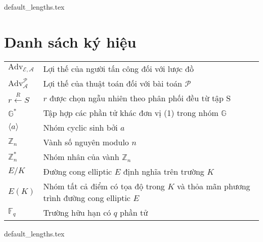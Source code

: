 \documentclass[class=report, crop=false]{standalone}
\begin{document}
	{default_lengths.tex}
	\baselineskip
	\chapter*{Danh sách ký hiệu}
	\begin{tabu}{>{\large}p{2cm} >{\large}X[l]}
		$\text{Adv}_\mathcal{E, A}$ 			& 	Lợi thế của người tấn công \adversary đối với lược đồ \scheme 							\\
		$\text{Adv}_\mathcal{A}^\mathcal{P}$ 	& 	Lợi thế của thuật toán \algo đối với bài toán $\mathcal{P}$ 							\\
		$r \xleftarrow{R} S$ 					& 	$r$ được chọn ngẫu nhiên theo phân phối đều từ tập S 									\\
		$\mathbb{G}^*$							& 	Tập hợp các phần tử khác đơn vị (1) trong nhóm $\mathbb{G}$ 							\\
		$\langle a \rangle$ 					& 	Nhóm cyclic sinh bởi $a$ 																\\
		$\mathbb{Z}_n$							& 	Vành số nguyên modulo $n$ 																\\
		$\mathbb{Z}_n^*$						& 	Nhóm nhân của vành $\mathbb{Z}_n$ 														\\
		$E/K$									&	Đường cong elliptic $E$ định nghĩa trên trường $K$ 										\\
		$E(K)$									&	Nhóm tất cả điểm có tọa độ trong $K$ và thỏa mãn phương trình đường cong elliptic $E$ 	\\
		$\mathbb{F}_q$							&	Trường hữu hạn có $q$ phần tử 															\\

	\end{tabu}
	\newpage
	{default_lengths.tex}
\end{document}
